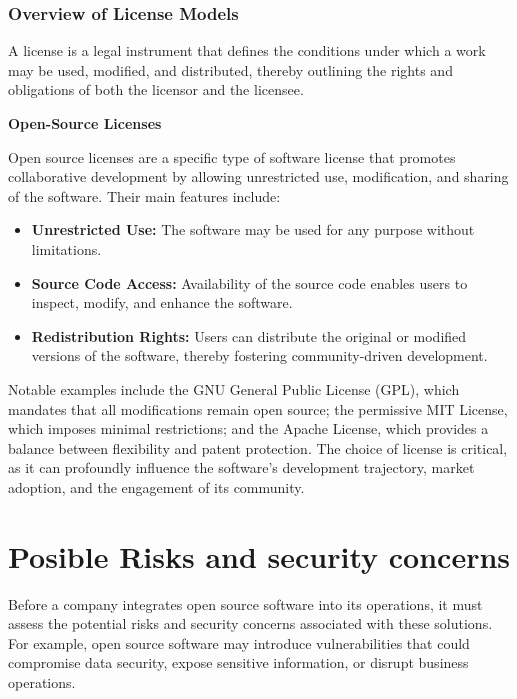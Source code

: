 \cite{OpenSource-Legal-Guide}

\subsubsection{Overview of License Models}

A license is a legal instrument that defines the conditions under which a work may be used, modified, and distributed, thereby outlining the rights and obligations of both the licensor and the licensee.

\textbf{Open-Source Licenses}

Open source licenses are a specific type of software license that promotes collaborative development by allowing unrestricted use, modification, and sharing of the software. Their main features include:

\begin{itemize}
    \item \textbf{Unrestricted Use:} The software may be used for any purpose without limitations.
    \item \textbf{Source Code Access:} Availability of the source code enables users to inspect, modify, and enhance the software.
    \item \textbf{Redistribution Rights:} Users can distribute the original or modified versions of the software, thereby fostering community-driven development.
\end{itemize}

Notable examples include the GNU General Public License (GPL), which mandates that all modifications remain open source; the permissive MIT License, which imposes minimal restrictions; and the Apache License, which provides a balance between flexibility and patent protection. The choice of license is critical, as it can profoundly influence the software’s development trajectory, market adoption, and the engagement of its community.

\cite{Software-Licensing-Types-Thales}


\section{Posible Risks and security concerns}

Before a company integrates open source software into its operations, it must assess the potential risks and security concerns associated with these solutions.
For example, open source software may introduce vulnerabilities that could compromise data security, expose sensitive information, or disrupt business operations.

